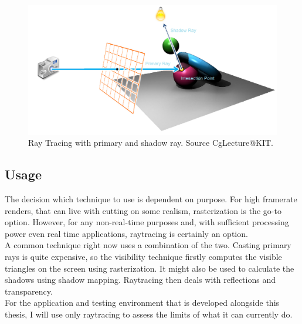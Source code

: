 \label{sec:raytracing}
\begin{figure}
    \centering
    \includegraphics[width=.9\textwidth]{images/showcase/cgRayTracingImg.PNG}
    \caption{Ray Tracing with primary and shadow ray. Source CgLecture@KIT.}
    \label{fig:cgRayTrace}
\end{figure}

\subsection{Usage}
\label{sec:RayRasterUsage}
The decision which technique to use is dependent on purpose. For high framerate renders, that can live with cutting on some realism, rasterization is the go-to option. However, for any non-real-time purposes and, with sufficient processing power even real time applications, raytracing is certainly an option.\\
A common technique right now uses a combination of the two. Casting primary rays is quite expensive, so the visibility technique firstly computes the visible triangles on the screen using rasterization. It might also be used to calculate the shadows using shadow mapping. Raytracing then deals with reflections and transparency.\\
For the application and testing environment that is developed alongside this thesis, I will use only raytracing to assess  the limits of what it can currently do.
\cite{rayRasterNvidiaBlog}
